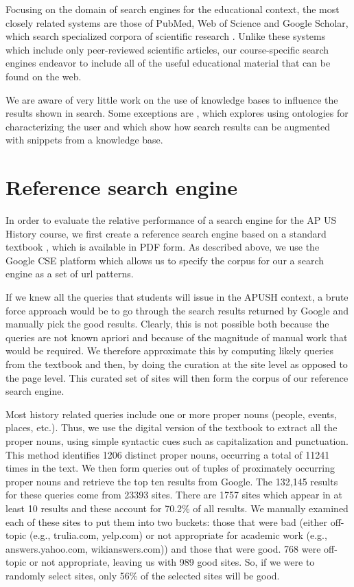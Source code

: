 \documentclass[pdfpagelabels=false,plainpages=true]{acm_proc_article-sp}
\begin{document}
Focusing on the domain of search engines for the educational context, the most
closely related systems are those of PubMed, Web of Science and Google
Scholar, which search specialized corpora of scientific research
\cite{jacso2005google}. Unlike these systems which include only
peer-reviewed scientific articles, our course-specific search engines
endeavor to include all of the useful educational material that can be found on
the web. 

We are aware of very little work on the use of knowledge bases to influence the
results shown in search. Some exceptions are \cite{jiang2009learning}, which explores
using ontologies for characterizing the user and \cite{guha2003semantic} which
show how search results can be augmented with snippets from a knowledge base.   

\section{Reference search engine}

In order to evaluate the relative performance of a search engine for the AP US
History course, we first create a reference search engine based on a standard textbook
\cite{textbook}, which is available in PDF form. As described above,
we use the Google CSE platform which allows us to specify the corpus for our a
search engine as a set of url patterns.

If we knew all the queries that students will issue in the APUSH context, a
brute force approach would be to go through the search results returned by
Google and manually pick the good results. Clearly, this is not possible both
because the queries are not known apriori and because of the magnitude of manual
work that would be required. We therefore approximate this by computing likely
queries from the textbook and then, by doing the curation at the site level as
opposed to the page level. This curated set of sites will then form the corpus
of our reference search engine.

Most history related queries include one or more proper nouns (people, events,
places, etc.). Thus, we use the digital version of the textbook \cite{textbook}
to extract all the proper nouns, using simple syntactic cues such as
capitalization and punctuation. This method identifies 1206 distinct proper
nouns, occurring a total of 11241 times in the text. We then form queries out of
tuples of proximately occurring proper nouns and retrieve the top ten results
from Google. The 132,145 results for these queries come from 23393 sites. There are
1757 sites which appear in at least 10 results and these account for 70.2\% of
all results. We manually examined each of these sites to put them into two
buckets: those that were bad (either off-topic (e.g., trulia.com, yelp.com)
or not appropriate for academic work (e.g., answers.yahoo.com, wikianswers.com))
and those that were good. 768 were off-topic or not appropriate, leaving us with
989 good sites. So, if we were to randomly select sites, only 56\% of the
selected sites will be good. 
\end{document}
